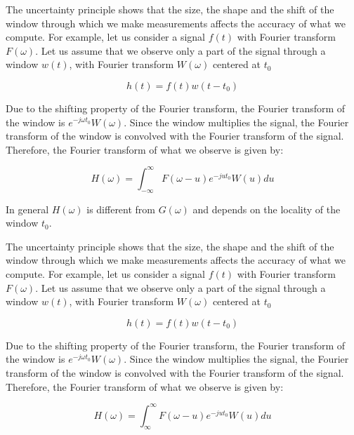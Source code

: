 The uncertainty principle shows that the size, the shape and the shift of the window through which we make measurements affects the accuracy of what we compute. For example, let us consider a signal $f(t)$ with Fourier transform $F(\omega)$. Let us assume that we observe only a part of the signal through a window $w(t)$, with Fourier transform $W(\omega)$ centered at $t_0$

\begin{equation}\label{eq:uncertainty_principle2}
    h(t) = f(t)w(t-t_0)
\end{equation}


Due to the shifting property of the Fourier transform, the Fourier transform of the window is $e^{-j\omega t_0}W(\omega)$. Since the window multiplies the signal, the Fourier transform of the window is convolved with the Fourier transform of the signal. Therefore, the Fourier transform of what we observe is given by:

\begin{equation}\label{eq:short_time_fourier_transform}
    H(\omega) = \int_{-\infty}^{\infty}F(\omega - u)e^{-ju t_0}W(u) du
\end{equation}


In general $H(\omega)$ is different from $G(\omega)$ and depends on the locality of the window $t_0$.

The uncertainty principle shows that the size, the shape and the shift of the window through which we make measurements affects the accuracy of what we compute. For example, let us consider a signal $f(t)$ with Fourier transform $F(\omega)$. Let us assume that we observe only a part of the signal through a window $w(t)$, with Fourier transform $W(\omega)$ centered at $t_0$

\begin{equation}\label{eq:uncertainty_principle2}
    h(t) = f(t)w(t-t_0)
\end{equation}


Due to the shifting property of the Fourier transform, the Fourier transform of the window is $e^{-j\omega t_0}W(\omega)$. Since the window multiplies the signal, the Fourier transform of the window is convolved with the Fourier transform of the signal. Therefore, the Fourier transform of what we observe is given by:

\begin{equation}\label{eq:short_time_fourier_transform}
    H(\omega) = \int_{\infty}^{\infty}F(\omega - u)e^{-ju t_0}W(u) du
\end{equation}


